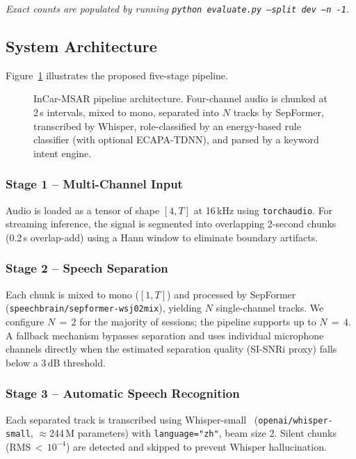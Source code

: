 \noindent\textit{Exact counts are populated by running \texttt{python evaluate.py --split dev --n -1}.}

\subsection{System Architecture}
\label{subsec:architecture}

Figure~\ref{fig:pipeline} illustrates the proposed five-stage pipeline.

\begin{figure}[h]
\centering
\caption{InCar-MSAR pipeline architecture. Four-channel audio
is chunked at 2\,s intervals, mixed to mono, separated into $N$ tracks
by SepFormer, transcribed by Whisper, role-classified by an energy-based
rule classifier (with optional ECAPA-TDNN), and parsed by a keyword
intent engine.}
\label{fig:pipeline}
\end{figure}

\subsubsection{Stage 1 – Multi-Channel Input}
Audio is loaded as a tensor of shape $[4, T]$ at 16\,kHz using
\texttt{torchaudio}. For streaming inference, the signal is segmented into
overlapping 2-second chunks (0.2\,s overlap-add) using a Hann window to
eliminate boundary artifacts.

\subsubsection{Stage 2 – Speech Separation}
Each chunk is mixed to mono ($[1, T]$) and processed by
SepFormer~\cite{subakan2021attention} (\texttt{speechbrain/sepformer-wsj02mix}),
yielding $N$ single-channel tracks. We configure $N\,{=}\,2$ for the majority
of sessions; the pipeline supports up to $N\,{=}\,4$. A fallback mechanism
bypasses separation and uses individual microphone channels directly when the
estimated separation quality (SI-SNRi proxy) falls below a 3\,dB threshold.

\subsubsection{Stage 3 – Automatic Speech Recognition}
Each separated track is transcribed using
Whisper-small~\cite{radford2023robust} (\texttt{openai/whisper-small},
$\approx$244\,M parameters) with \texttt{language="zh"}, beam size 2.
Silent chunks (RMS\,$<\,10^{-4}$) are detected and skipped to prevent
Whisper hallucination.


